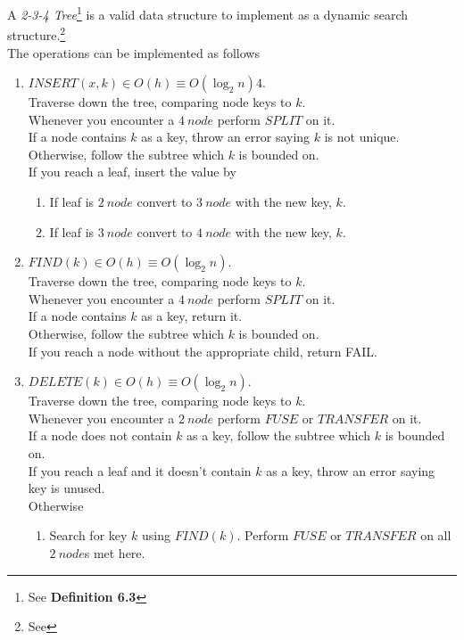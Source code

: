 \documentclass[11pt,a4paper]{article}
\begin{document}
A \textit{2-3-4 Tree}\footnote{See \textbf{Definition 6.3}} is a valid data structure to implement as a dynamic search structure.\footnote{See {}}\\
The operations can be implemented as follows
\begin{enumerate}[label=\roman*)]
	\item $INSERT(x,k)\in O(h)\equiv O(\log_2n)4$.\\
	Traverse down the tree, comparing node keys to $k$.\\	
	Whenever you encounter a $4\ node$ perform $SPLIT$ on it.\\
	If a node contains $k$ as a key, throw an error saying $k$ is not unique.\\
	Otherwise, follow the subtree which $k$ is bounded on.\\		
	If you reach a leaf, insert the value by
	\begin{enumerate}
	  \item If leaf is $2\ node$ convert to $3\ node$ with the new key, $k$.
	  \item If leaf is $3\ node$ convert to $4\ node$ with the new key, $k$.
	\end{enumerate}
	\item $FIND(k)\in O(h)\equiv O(\log_2n)$.\\
	Traverse down the tree, comparing node keys to $k$.\\
	\quad Whenever you encounter a $4\ node$ perform $SPLIT$ on it.\\
	If a node contains $k$ as a key, return it.\\
	Otherwise, follow the subtree which $k$ is bounded on.\\
	If you reach a node without the appropriate child, return FAIL.
	\item $DELETE(k)\in O(h)\equiv O(\log_2n)$.\\
	Traverse down the tree, comparing node keys to $k$.\\
	Whenever you encounter a $2\ node$ perform $FUSE$ or $TRANSFER$ on it.\\
	If a node does not contain $k$ as a key, follow the subtree which $k$ is bounded on.\\
	If you reach a leaf and it doesn't contain $k$ as a key, throw an error saying key is unused.\\
	Otherwise
	\begin{enumerate}
	  \item Search for key $k$ using $FIND(k)$. Perform $FUSE$ or $TRANSFER$ on all $2\ node$s met here.

\end{enumerate}
\end{enumerate}
\end{document}
